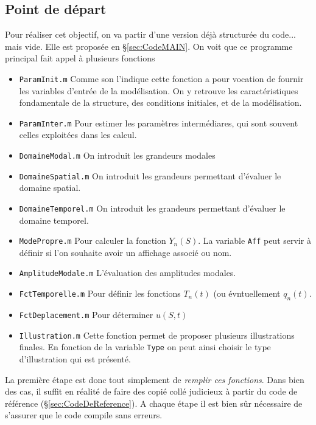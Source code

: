 \documentclass[a4paper,10pt]{article}
\begin{document}
\subsection{Point de départ}
Pour réaliser cet objectif, on va partir d'une version déjà structurée du code... mais vide. Elle est proposée en \S\ref{sec:CodeMAIN}. On voit que ce programme principal fait appel à plusieurs fonctions
\begin{itemize}
    \item \verb"ParamInit.m" Comme son l'indique cette fonction a pour vocation de fournir les variables d'entrée de la modélisation. On y retrouve les caractéristiques fondamentale de la structure, des conditions initiales, et de la modélisation.
    \item \verb"ParamInter.m" Pour estimer les paramètres intermédiares, qui sont souvent celles exploitées dans les calcul. 
    \item \verb"DomaineModal.m" On introduit les grandeurs modales
    \item \verb"DomaineSpatial.m" On introduit les grandeurs permettant d'évaluer le domaine spatial.
    \item \verb"DomaineTemporel.m" On introduit les grandeurs permettant d'évaluer le domaine temporel.
    \item \verb"ModePropre.m" Pour calculer la fonction $Y_n(S)$. La variable \verb"Aff" peut servir à définir si l'on souhaite avoir un affichage associé ou nom. 
    \item \verb"AmplitudeModale.m" L'évaluation des amplitudes modales.
    \item \verb"FctTemporelle.m" Pour définir les fonctions $T_n(t)$ (ou évntuellement $q_n(t)$.
    \item \verb"FctDeplacement.m" Pour déterminer $u(S,t)$
    \item \verb"Illustration.m" Cette fonction permet de proposer plusieurs illustrations finales. En fonction de la variable \verb"Type" on peut ainsi choisir le type d'illustration qui est présenté. 
\end{itemize}
La première étape est donc tout simplement de \emph{remplir ces fonctions}. Dans bien des cas, il suffit en réalité de faire des copié collé judicieux à partir du code de référence (\S\ref{sec:CodeDeReference}). 
A chaque étape il est bien sûr nécessaire de s'assurer que le code compile sans erreurs.
\end{document}
